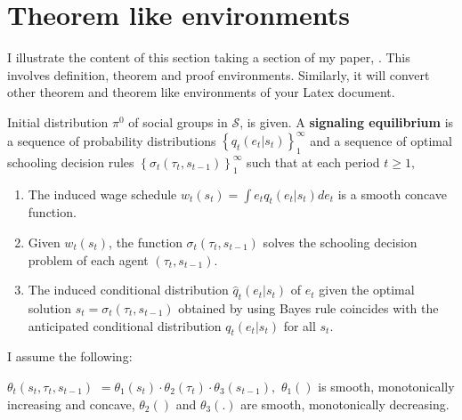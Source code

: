 \documentclass[12pt,svgnames]{article}
\begin{document}
\section{Theorem like environments} \label{sec7}
I illustrate the content of this section taking a section of my paper, \cite{Raut_2017a}. This involves definition, theorem and proof environments.  Similarly, it will convert other theorem and theorem like environments of your Latex document.
 
\begin{definition}
\label{def1} Initial distribution $\pi ^{0}$ of social groups in $\mathcal{S}$, is given. A \textbf{signaling equilibrium} is a sequence of probability distributions $\left\{ q_{t}\left( e_{t}|s_{t}\right) \right\} _{1}^{\infty }$ and a sequence of optimal schooling decision rules $\left\{ \sigma _{t}\left( \tau _{t},s_{t-1}\right) \right\} _{1}^{\infty }$ such that at each period $t\geq 1,$

\begin{enumerate}
\item The induced wage schedule $w_{t}\left( s_t\right) =\int e_{t}q_{t}\left(
e_{t}|s_{t}\right)  de_{t}$ is a smooth concave function.

\item Given $w_{t}\left( s_t\right)$, the function $\sigma _{t}\left(\tau
_{t},s_{t-1}\right)$ solves the schooling decision problem of each
agent $\left( \tau _{t},s_{t-1}\right)$.

\item The induced  conditional distribution $\hat{q}_{t}\left( e_{t}|s_{t}\right)$ of $e_{t}$ given the optimal solution 
$s_{t}=\sigma _{t}\left( \tau _{t},s_{t-1}\right)$ obtained by using Bayes
rule coincides with the anticipated conditional distribution $q_{t}\left(
e_{t}|s_{t}\right)$ for all $s_{t}$.
\end{enumerate}
\end{definition}


I assume the following:

\begin{assumption}
\label{A1}$\theta _{t}(s_{t},\tau _{t},s_{t-1})$ $=\theta _{1}\left( s_{t}\right) \cdot \theta _{2}\left( \tau _{t}\right) \cdot \theta _{3}\left( s_{t-1}\right) ,$ $\theta _{1}\left( {}\right)$ is smooth, monotonically increasing and concave, $\theta _{2}\left( {}\right)$ and $\theta _{3}\left( .\right)$ are smooth, monotonically decreasing.
\end{assumption}
\end{document}
